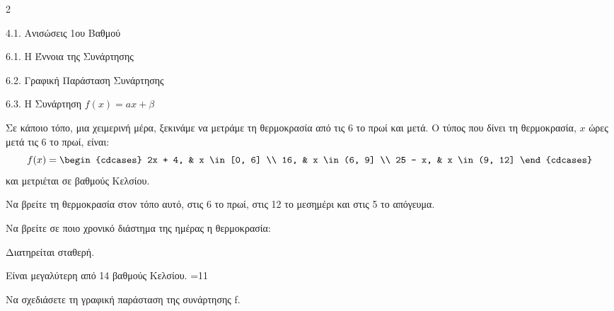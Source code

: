 \begin{ylh}{2}
    \item 4.1. Ανισώσεις 1ου Βαθμού
    \item 6.1. Η Έννοια της Συνάρτησης
    \item 6.2. Γραφική Παράσταση Συνάρτησης
    \item 6.3. Η Συνάρτηση $f(x)=ax+\beta$
\end{ylh}
Σε κάποιο τόπο, μια χειμερινή μέρα, ξεκινάμε να μετράμε τη θερμοκρασία από τις 6 το πρωί και μετά. Ο τύπος που δίνει τη θερμοκρασία, $x$ ώρες μετά τις 6 το πρωί, είναι:
\[f(x) = \begin{cdcases} 2x + 4, & x \in [0, 6] \\ 16, & x \in (6, 9] \\ 25 - x, & x \in (9, 12] \end{cdcases}\]
 και μετριέται σε βαθμούς Κελσίου.
\begin{alist}
\item Να βρείτε τη θερμοκρασία στον τόπο αυτό, στις 6 το πρωί, στις 12 το μεσημέρι και στις 5 το απόγευμα.
\item Να βρείτε σε ποιο χρονικό διάστημα της ημέρας η θερμοκρασία:
\begin{rlist}
\item
  Διατηρείται σταθερή.
\item
  Είναι μεγαλύτερη από 14 βαθμούς Κελσίου.
=11
\item Να σχεδιάσετε τη γραφική παράσταση της συνάρτησης f.
\end{rlist}
\end{alist}


